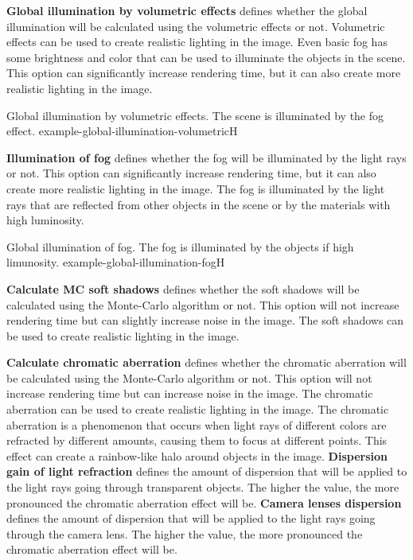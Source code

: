 \textbf{Global illumination by volumetric effects} defines whether the global illumination will be calculated using the volumetric effects or not. Volumetric effects can be used to create realistic lighting in the image. Even basic fog has some brightness and color that can be used to illuminate the objects in the scene. This option can significantly increase rendering time, but it can also create more realistic lighting in the image.

{Global illumination by volumetric effects. The scene is illuminated by the fog effect.}
{example-global-illumination-volumetric}{H}

\textbf{Illumination of fog} defines whether the fog will be illuminated by the light rays or not. This option can significantly increase rendering time, but it can also create more realistic lighting in the image. The fog is illuminated by the light rays that are reflected from other objects in the scene or by the materials with high luminosity. 

{Global illumination of fog. The fog is illuminated by the objects if high limunosity.}
{example-global-illumination-fog}{H}

\textbf{Calculate MC soft shadows} defines whether the soft shadows will be calculated using the Monte-Carlo algorithm or not. This option will not increase rendering time but can slightly increase noise in the image. The soft shadows can be used to create realistic lighting in the image.

\textbf{Calculate chromatic aberration} defines whether the chromatic aberration will be calculated using the Monte-Carlo algorithm or not. This option will not increase rendering time but can increase noise in the image. The chromatic aberration can be used to create realistic lighting in the image. The chromatic aberration is a phenomenon that occurs when light rays of different colors are refracted by different amounts, causing them to focus at different points. This effect can create a rainbow-like halo around objects in the image. \textbf{Dispersion gain of light refraction} defines the amount of dispersion that will be applied to the light rays going through transparent objects. The higher the value, the more pronounced the chromatic aberration effect will be. \textbf{Camera lenses dispersion} defines the amount of dispersion that will be applied to the light rays going through the camera lens. The higher the value, the more pronounced the chromatic aberration effect will be. 

